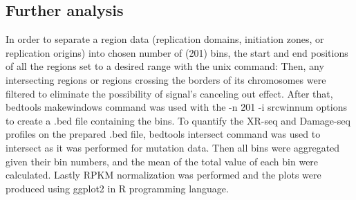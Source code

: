 \subsection{Further analysis}
In order to separate a region data (replication domains, initiation zones, or replication origins) into chosen number of (201) bins, the start and end positions of all the regions set to a desired range with the unix command: %
Then, any intersecting regions or regions crossing the borders of its chromosomes were filtered to eliminate the possibility of signal's canceling out effect. After that, bedtools makewindows command was used with the -n 201 -i srcwinnum options to create a .bed file containing the bins.
To quantify the XR-seq and Damage-seq profiles on the prepared .bed file, bedtools intersect command was used to intersect as it was performed for mutation data. Then all bins were aggregated given their bin numbers, and the mean of the total value of each bin were calculated. Lastly RPKM normalization was performed and the plots were produced using ggplot2 in R programming language.